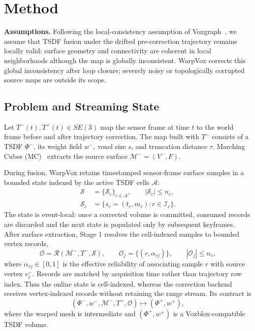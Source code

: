 \section{Method}
\label{sec:method}

\noindent\textbf{Assumptions.}
Following the local-consistency assumption of
Voxgraph~\cite{reijgwart2020voxgraph}, we assume that TSDF fusion under the
drifted pre-correction trajectory remains locally valid: surface geometry and
connectivity are coherent in local neighborhoods although the map is globally
inconsistent. WarpVox corrects this global inconsistency after loop closure;
severely noisy or topologically corrupted source maps are outside its scope.

\subsection{Problem and Streaming State}

Let $T^-(t),T^+(t)\in SE(3)$ map the sensor frame at time $t$ to the world
frame before and after trajectory correction. The map built with $T^-$ consists
of a TSDF $\Phi^-$, its weight field $w^-$, voxel size $s$, and truncation
distance $\tau$. Marching Cubes (MC)~\cite{10.1145/37402.37422} extracts the
source surface $\mathcal M^-=(V^-,F)$.

During fusion, WarpVox retains timestamped sensor-frame surface samples in a
bounded state indexed by the active TSDF cells $\mathcal A$:
\begin{equation}
\begin{aligned}
\mathcal S&=\{\mathcal S_c\}_{c\in\mathcal A},\qquad |\mathcal S_c|\le n_c,\\
\mathcal S_c&=\{s_r=(t_r,m_r):r\in\mathcal I_c\}.
\end{aligned}
\label{eq:streaming_state}
\end{equation}
The state is event-local: once a corrected volume is committed, consumed
records are discarded and the next state is populated only by subsequent
keyframes. After surface extraction, Stage 1 resolves the cell-indexed samples
to bounded vertex records,
\begin{equation}
\mathcal O=\mathcal R(\mathcal M^-,T^-,\mathcal S),
\qquad
\mathcal O_j=\{(r,\alpha_{rj})\},
\qquad |\mathcal O_j|\le n_v,
\label{eq:resolved_records}
\end{equation}
where $\alpha_{rj}\in[0,1]$ is the effective reliability of associating sample
$r$ with source vertex $v_j^-$. Records are matched by acquisition time rather
than trajectory row index. Thus the online state is cell-indexed, whereas the
correction backend receives vertex-indexed records without retaining the range
stream. Its contract is
\begin{equation}
(\Phi^-,w^-,\mathcal M^-,T^+,\mathcal O)
\longmapsto (\Phi^+,w^+),
\label{eq:contract}
\end{equation}
where the warped mesh is intermediate and $(\Phi^+,w^+)$ is a
Voxblox-compatible TSDF volume.

